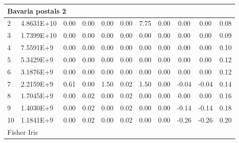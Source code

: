 {\begin{longtable}{@{}llccccccccc@{}}
\multicolumn{11}{l}{Bavaria postals 2}                                                                                                                                                            \\ \hline
\multicolumn{1}{l|}{2}  & \multicolumn{1}{l|}{4.8631E+10} & 0.00 & \multicolumn{1}{c|}{0.00} & 0.00 & \multicolumn{1}{c|}{0.00} & 7.75 & \multicolumn{1}{c|}{0.00} & 0.00      & 0.00      & 0.08 \\
\multicolumn{1}{l|}{3}  & \multicolumn{1}{l|}{1.7399E+10} & 0.00 & \multicolumn{1}{c|}{0.00} & 0.00 & \multicolumn{1}{c|}{0.00} & 0.00 & \multicolumn{1}{c|}{0.00} & 0.00      & 0.00      & 0.09 \\
\multicolumn{1}{l|}{4}  & \multicolumn{1}{l|}{7.5591E+9}  & 0.00 & \multicolumn{1}{c|}{0.00} & 0.00 & \multicolumn{1}{c|}{0.00} & 0.00 & \multicolumn{1}{c|}{0.00} & 0.00      & 0.00      & 0.10 \\
\multicolumn{1}{l|}{5}  & \multicolumn{1}{l|}{5.3429E+9}  & 0.00 & \multicolumn{1}{c|}{0.00} & 0.00 & \multicolumn{1}{c|}{0.00} & 0.00 & \multicolumn{1}{c|}{0.00} & 0.00      & 0.00      & 0.12 \\
\multicolumn{1}{l|}{6}  & \multicolumn{1}{l|}{3.1876E+9}  & 0.00 & \multicolumn{1}{c|}{0.00} & 0.00 & \multicolumn{1}{c|}{0.00} & 0.00 & \multicolumn{1}{c|}{0.00} & 0.00      & 0.00      & 0.12 \\
\multicolumn{1}{l|}{7}  & \multicolumn{1}{l|}{2.2159E+9}  & 0.61 & \multicolumn{1}{c|}{0.00} & 1.50 & \multicolumn{1}{c|}{0.02} & 1.50 & \multicolumn{1}{c|}{0.00} & -0.04     & -0.04     & 0.14 \\
\multicolumn{1}{l|}{8}  & \multicolumn{1}{l|}{1.7045E+9}  & 0.00 & \multicolumn{1}{c|}{0.02} & 0.00 & \multicolumn{1}{c|}{0.02} & 0.00 & \multicolumn{1}{c|}{0.00} & 0.00      & 0.00      & 0.16 \\
\multicolumn{1}{l|}{9}  & \multicolumn{1}{l|}{1.4030E+9}  & 0.00 & \multicolumn{1}{c|}{0.02} & 0.00 & \multicolumn{1}{c|}{0.02} & 0.00 & \multicolumn{1}{c|}{0.00} & -0.14     & -0.14     & 0.18 \\
\multicolumn{1}{l|}{10} & \multicolumn{1}{l|}{1.1841E+9}  & 0.00 & \multicolumn{1}{c|}{0.02} & 0.00 & \multicolumn{1}{c|}{0.02} & 0.00 & \multicolumn{1}{c|}{0.00} & -0.26     & -0.26     & 0.20 \\ \hline
\multicolumn{11}{l}{Fisher Iris}                                                                                                                                                                  \\ \hline

\end{longtable}}
